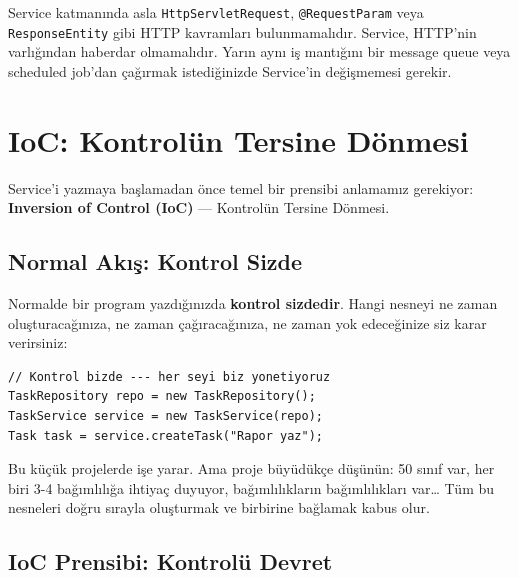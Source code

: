 \documentclass[11pt,a4paper]{article}
\begin{document}
\begin{dangerbox}
Service katman{\i}nda asla \texttt{HttpServletRequest}, \texttt{@RequestParam} veya \texttt{ResponseEntity} gibi HTTP kavramlar{\i} bulunmamal{\i}d{\i}r. Service, HTTP'nin varl{\i}\u{g}{\i}ndan haberdar olmamal{\i}d{\i}r. Yar{\i}n ayn{\i} i\c{s} mant{\i}\u{g}{\i}n{\i} bir message queue veya scheduled job'dan \c{c}a\u{g}{\i}rmak istedi\u{g}inizde Service'in de\u{g}i\c{s}memesi gerekir.
\end{dangerbox}

\newpage

\section{IoC: Kontrol\"{u}n Tersine D\"{o}nmesi}

Service'i yazmaya ba\c{s}lamadan \"{o}nce temel bir prensibi anlamam{\i}z gerekiyor: \textbf{Inversion of Control (IoC)} --- Kontrol\"{u}n Tersine D\"{o}nmesi.

\subsection*{Normal Ak{\i}\c{s}: Kontrol Sizde}

Normalde bir program yazd{\i}\u{g}{\i}n{\i}zda \textbf{kontrol sizdedir}. Hangi nesneyi ne zaman olu\c{s}turaca\u{g}{\i}n{\i}za, ne zaman \c{c}a\u{g}{\i}raca\u{g}{\i}n{\i}za, ne zaman yok edece\u{g}inize siz karar verirsiniz:

\begin{lstlisting}[style=java]
// Kontrol bizde --- her seyi biz yonetiyoruz
TaskRepository repo = new TaskRepository();
TaskService service = new TaskService(repo);
Task task = service.createTask("Rapor yaz");
\end{lstlisting}

Bu k\"{u}\c{c}\"{u}k projelerde i\c{s}e yarar. Ama proje b\"{u}y\"{u}d\"{u}k\c{c}e d\"{u}\c{s}\"{u}n\"{u}n: 50 s{\i}n{\i}f var, her biri 3-4 ba\u{g}{\i}ml{\i}l{\i}\u{g}a ihtiya\c{c} duyuyor, ba\u{g}{\i}ml{\i}l{\i}klar{\i}n ba\u{g}{\i}ml{\i}l{\i}klar{\i} var\ldots{} T\"{u}m bu nesneleri do\u{g}ru s{\i}rayla olu\c{s}turmak ve birbirine ba\u{g}lamak kabus olur.

\subsection*{IoC Prensibi: Kontrol\"{u} Devret}
\end{document}
